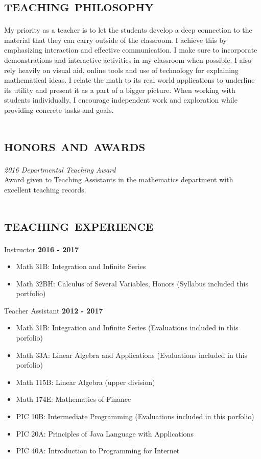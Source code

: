 \documentclass[margin, 10pt]{res} %
\begin{document}
\begin{resume}


\section{\textsc{teaching philosophy}}
My priority as a teacher is to let the students develop a deep connection to the material that they can carry outside of the classroom.
I achieve this by emphasizing interaction and effective communication.
I make sure to incorporate demonstrations and interactive activities in my classroom when possible.
I also rely heavily on visual aid, online tools and use of technology for explaining mathematical ideas.
I relate the math to its real world applications to underline its utility and present it as a part of a bigger picture.
When working with students individually, I encourage independent work and exploration while providing concrete tasks and goals.

\section{\textsc{honors and awards}}
\textit{2016 Departmental Teaching Award} \\
Award given to Teaching Assistants in the mathematics department with excellent teaching records.

\section{\textsc{teaching experience}}
Instructor \hfill \textbf{2016 - 2017} 
  \begin{itemize}
  \item Math 31B: Integration and Infinite Series 
  \item Math 32BH: Calculus of Several Variables, Honors (Syllabus included this portfolio)
  \end{itemize}
Teacher Assistant \hfill \textbf{2012 - 2017} 
  \begin{itemize}
	  \item Math 31B: Integration and Infinite Series (Evaluations included in this porfolio)
  \item Math 33A: Linear Algebra and Applications (Evaluations included in this porfolio)
  \item Math 115B: Linear Algebra (upper division)
  \item Math 174E: Mathematics of Finance 
  \item PIC 10B: Intermediate Programming (Evaluations included in this porfolio)
  \item PIC 20A: Principles of Java Language with Applications
  \item PIC 40A: Introduction to Programming for Internet
  \end{itemize}


\end{resume}
\end{document}
